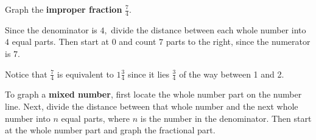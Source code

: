 \documentclass[handout, font=12pt]{ximera}
\begin{document}
\begin{example}

Graph the \textbf{improper fraction} $\textstyle \frac{7}{4}.$ 

\begin{explanation}

Since the denominator is $4,$ divide the distance between each whole number into $4$ equal parts.  Then start at $0$ and count $7$ 
parts to the right, since the numerator is $7.$

\begin{center}

\end{center}

\begin{remark}
Notice that $\frac{7}{4}$ is equivalent to $1 \frac{3}{4}$ since it lies $\frac{3}{4}$ of the way between 1 and 2.
\end{remark}

\end{explanation}
\end{example}

To graph a \textbf{mixed number}, first locate the whole number part on the number line. Next, divide the distance between 
that whole number and the next whole number into $n$ equal parts, where $n$ is the number in the denominator.  Then start 
at the whole number part and graph the fractional part.
\end{document}
